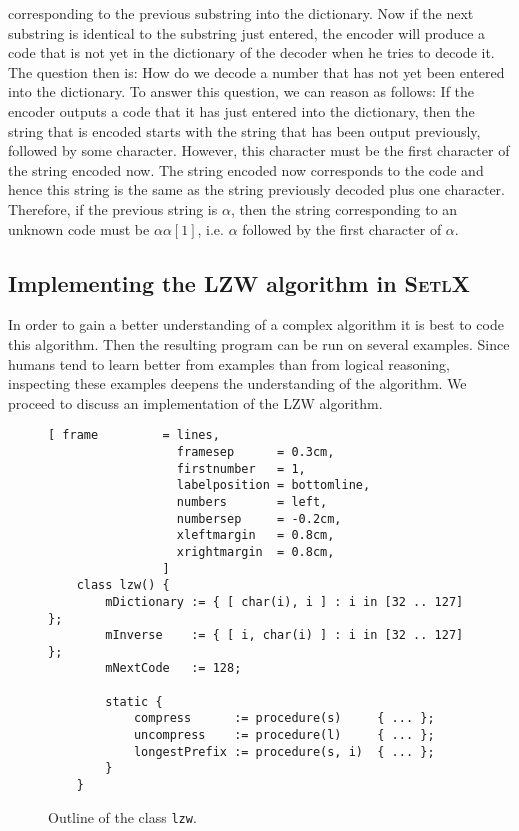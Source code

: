 corresponding to the previous substring into the dictionary.  Now if the next substring is identical
to the substring just entered, the encoder will produce a code that is not yet in the dictionary of
the decoder when he tries to decode it.   The question then is: How do we decode a number that has
not yet been entered into the dictionary.  To answer this question, we can reason as follows:
If the encoder outputs a code that it has just entered into the dictionary, then the string that is
encoded starts with the string that has been output previously, followed by some character.  However,
this character must be the first character of the string encoded now.  The string encoded now
corresponds to the code and hence this string is the same as the string previously decoded plus one
character. Therefore, if the previous string is $\alpha$, then the string
corresponding to an unknown code must be $\alpha \alpha[1]$, i.e. $\alpha$ followed by the first
character of $\alpha$.



\subsection{Implementing the LZW algorithm in \textsc{SetlX}}
In order to gain a better understanding of a complex algorithm it is best to code this algorithm.
Then the resulting program can be run on several examples.  Since humans tend
to learn better from examples than from logical reasoning, inspecting these examples deepens
the understanding of the algorithm.  We proceed to discuss an implementation of the LZW
algorithm.  

\begin{figure}[!ht]
\centering
\begin{Verbatim}[ frame         = lines, 
                  framesep      = 0.3cm, 
                  firstnumber   = 1,
                  labelposition = bottomline,
                  numbers       = left,
                  numbersep     = -0.2cm,
                  xleftmargin   = 0.8cm,
                  xrightmargin  = 0.8cm,
                ]
    class lzw() {
        mDictionary := { [ char(i), i ] : i in [32 .. 127] };
        mInverse    := { [ i, char(i) ] : i in [32 .. 127] };
        mNextCode   := 128;
    
        static {
            compress      := procedure(s)     { ... };
            uncompress    := procedure(l)     { ... };
            longestPrefix := procedure(s, i)  { ... };
        }
    }
\end{Verbatim}
\vspace*{-0.3cm}
\caption{Outline of the class \texttt{lzw}.}
\label{fig:lzw.stlx-outline}
\end{figure}


